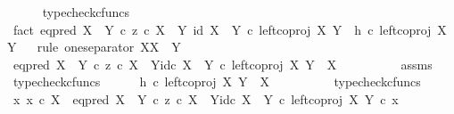 \begin{isabellebody}
\ \ \ \ \isamarkupfalse%
\ typecheck{\isacharunderscore}{\kern0pt}cfuncs\isanewline
\isanewline
\ \ \isamarkupfalse%
\ fact{}{\isacharcolon}{\kern0pt}\ {\isachardoublequoteopen}{\isacharparenleft}{\kern0pt}eq{\isacharunderscore}{\kern0pt}pred\ {\isacharparenleft}{\kern0pt}X\ {\isasymCoprod}\ Y{\isacharparenright}{\kern0pt}\ {\isasymcirc}\isactrlsub c\ {\isasymlangle}z\ {\isasymcirc}\isactrlsub c\ {\isasymbeta}\isactrlbsub X\ {\isasymCoprod}\ Y\isactrlesub {\isacharcomma}{\kern0pt}\ id\ {\isacharparenleft}{\kern0pt}X\ {\isasymCoprod}\ Y{\isacharparenright}{\kern0pt}{\isasymrangle}{\isacharparenright}{\kern0pt}\ {\isasymcirc}\isactrlsub c\ left{\isacharunderscore}{\kern0pt}coproj\ X\ Y\ {\isacharequal}{\kern0pt}\ h\ {\isasymcirc}\isactrlsub c\ left{\isacharunderscore}{\kern0pt}coproj\ X\ Y{\isachardoublequoteclose}\isanewline
\ \ \isamarkupfalse%
{\isacharparenleft}{\kern0pt}rule\ one{\isacharunderscore}{\kern0pt}separator{\isacharbrackleft}{\kern0pt}\ X{\isacharequal}{\kern0pt}X{\isacharcomma}{\kern0pt}\ \ Y\ {\isacharequal}{\kern0pt}\ {\isasymOmega}{\isacharbrackright}{\kern0pt}{\isacharparenright}{\kern0pt}\isanewline
\ \ \ \ \isamarkupfalse%
\ {\isachardoublequoteopen}{\isacharparenleft}{\kern0pt}eq{\isacharunderscore}{\kern0pt}pred\ {\isacharparenleft}{\kern0pt}X\ {\isasymCoprod}\ Y{\isacharparenright}{\kern0pt}\ {\isasymcirc}\isactrlsub c\ {\isasymlangle}z\ {\isasymcirc}\isactrlsub c\ {\isasymbeta}\isactrlbsub X\ {\isasymCoprod}\ Y\isactrlesub {\isacharcomma}{\kern0pt}id\isactrlsub c\ {\isacharparenleft}{\kern0pt}X\ {\isasymCoprod}\ Y{\isacharparenright}{\kern0pt}{\isasymrangle}{\isacharparenright}{\kern0pt}\ {\isasymcirc}\isactrlsub c\ left{\isacharunderscore}{\kern0pt}coproj\ X\ Y\ {\isacharcolon}{\kern0pt}\ X\ {\isasymrightarrow}\ {\isasymOmega}{\isachardoublequoteclose}\isanewline
\ \ \ \ \ \ \isamarkupfalse%
\ assms\ \isamarkupfalse%
\ typecheck{\isacharunderscore}{\kern0pt}cfuncs\isanewline
\ \ \ \ \isamarkupfalse%
\ {\isachardoublequoteopen}h\ {\isasymcirc}\isactrlsub c\ left{\isacharunderscore}{\kern0pt}coproj\ X\ Y\ {\isacharcolon}{\kern0pt}\ X\ {\isasymrightarrow}\ {\isasymOmega}{\isachardoublequoteclose}\isanewline
\ \ \ \ \ \ \isamarkupfalse%
\ typecheck{\isacharunderscore}{\kern0pt}cfuncs\isanewline
\ \ \ \ \isamarkupfalse%
\ {\isachardoublequoteopen}{\isasymAnd}x{\isachardot}{\kern0pt}\ x\ {\isasymin}\isactrlsub c\ X\ {\isasymLongrightarrow}\ {\isacharparenleft}{\kern0pt}{\isacharparenleft}{\kern0pt}eq{\isacharunderscore}{\kern0pt}pred\ {\isacharparenleft}{\kern0pt}X\ {\isasymCoprod}\ Y{\isacharparenright}{\kern0pt}\ {\isasymcirc}\isactrlsub c\ {\isasymlangle}z\ {\isasymcirc}\isactrlsub c\ {\isasymbeta}\isactrlbsub X\ {\isasymCoprod}\ Y\isactrlesub {\isacharcomma}{\kern0pt}id\isactrlsub c\ {\isacharparenleft}{\kern0pt}X\ {\isasymCoprod}\ Y{\isacharparenright}{\kern0pt}{\isasymrangle}{\isacharparenright}{\kern0pt}\ {\isasymcirc}\isactrlsub c\ left{\isacharunderscore}{\kern0pt}coproj\ X\ Y{\isacharparenright}{\kern0pt}\ {\isasymcirc}\isactrlsub c\ x\ {\isacharequal}{\kern0pt}\isanewline

\end{isabellebody}
